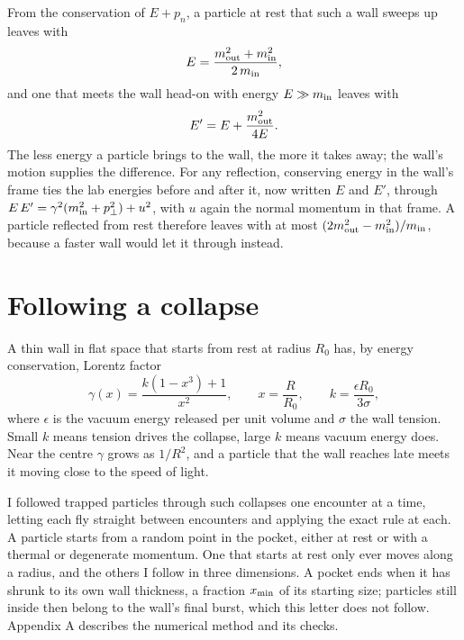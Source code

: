 \documentclass[10pt,twocolumn,a4paper]{article}
\begin{document}
From the conservation of $E + p_n$, a particle at rest that such a wall sweeps up leaves with
\begin{equation}
  E = \frac{m_{\rm out}^2 + m_{\rm in}^2}{2\,m_{\rm in}},
  \label{eq:1}
\end{equation}
and one that meets the wall head-on with energy $E \gg m_{\rm in}$ leaves with
\begin{equation}
  E' = E + \frac{m_{\rm out}^2}{4E}.
  \label{eq:2}
\end{equation}
The less energy a particle brings to the wall, the more it takes away; the wall's motion supplies
the difference. For any reflection, conserving energy in the wall's frame ties the lab energies
before and after it, now written $E$ and $E'$, through $E\,E' = \gamma^2 (m_{\rm in}^2 + p_\perp^2)
+ u^2$, with $u$ again the normal momentum in that frame. A particle reflected from rest therefore
leaves with at most $(2m_{\rm out}^2 - m_{\rm in}^2)/m_{\rm in}$, because a faster wall would let it
through instead.

\section{Following a collapse}

A thin wall in flat space that starts from rest at radius $R_0$ has, by energy conservation, Lorentz
factor
\begin{equation}
  \gamma(x) = \frac{k(1 - x^3) + 1}{x^2}, \qquad x = \frac{R}{R_0}, \qquad k = \frac{\epsilon R_0}{3\sigma},
  \label{eq:3}
\end{equation}
where $\epsilon$ is the vacuum energy released per unit volume and $\sigma$ the wall tension. Small
$k$ means tension drives the collapse, large $k$ means vacuum energy does. Near the centre $\gamma$
grows as $1/R^2$, and a particle that the wall reaches late meets it moving close to the speed of
light.

I followed trapped particles through such collapses one encounter at a time, letting each fly
straight between encounters and applying the exact rule at each. A particle starts from a random
point in the pocket, either at rest or with a thermal or degenerate momentum. One that starts at
rest only ever moves along a radius, and the others I follow in three dimensions. A pocket ends when
it has shrunk to its own wall thickness, a fraction $x_{\rm min}$ of its starting size; particles
still inside then belong to the wall's final burst, which this letter does not follow. Appendix A
describes the numerical method and its checks.
\end{document}
